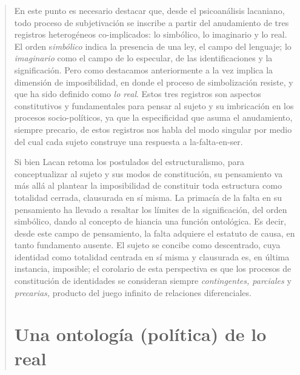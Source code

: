 \begin{quote}
En este punto es necesario destacar que, desde el psicoanálisis lacaniano, todo proceso de subjetivación se inscribe a partir del anudamiento de tres registros heterogéneos co-implicados: lo simbólico, lo imaginario y lo real. El orden s\emph{imbólico} indica la presencia de una ley, el campo del lenguaje; lo \emph{imaginario} como el campo de lo especular, de las identificaciones y la significación. Pero como destacamos anteriormente a la vez implica la dimensión de imposibilidad, en donde el proceso de simbolización resiste, y que ha sido definido como \emph{lo real}. Estos tres registros son aspectos constitutivos y fundamentales para pensar al sujeto y su imbricación en los procesos socio-políticos, ya que la especificidad que asuma el anudamiento, siempre precario, de estos registros nos habla del modo singular por medio del cual cada sujeto construye una respuesta a la-falta-en-ser.

Si bien Lacan retoma los postulados del estructuralismo, para conceptualizar al sujeto y sus modos de constitución, su pensamiento va más allá al plantear la imposibilidad de constituir toda estructura como totalidad cerrada, clausurada en sí misma. La primacía de la falta en su pensamiento ha llevado a resaltar los límites de la significación, del orden simbólico, dando al concepto de hiancia una función ontológica. Es decir, desde este campo de pensamiento, la falta adquiere el estatuto de causa, en tanto fundamento ausente. El sujeto se concibe como descentrado, cuya identidad como totalidad centrada en sí misma y clausurada es, en última instancia, imposible; el corolario de esta perspectiva es que los procesos de constitución de identidades se consideran siempre \emph{contingentes, parciales} y \emph{precarias,} producto del juego infinito de relaciones diferenciales.

\section{Una ontología (política) de lo real}


\end{quote}
